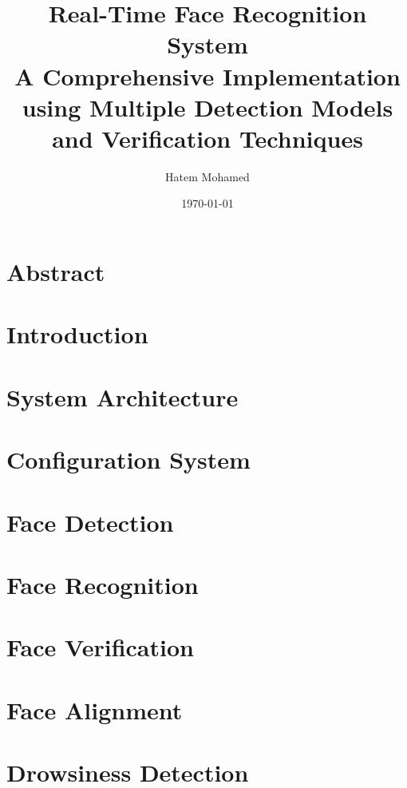 \documentclass[12pt,a4paper]{report}
\title{%
  \textbf{Real-Time Face Recognition System} \\
  \large A Comprehensive Implementation using Multiple Detection Models and Verification Techniques}
\author{Hatem Mohamed}
\date{\today}
\begin{document}
\maketitle
\tableofcontents

\chapter*{Abstract}


\chapter{Introduction}


\chapter{System Architecture}


\chapter{Configuration System}


\chapter{Face Detection}


\chapter{Face Recognition}


\chapter{Face Verification}


\chapter{Face Alignment}


\chapter{Drowsiness Detection}

\end{document}

